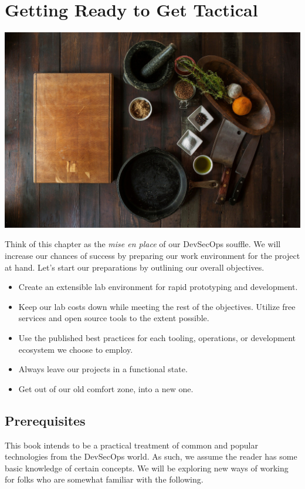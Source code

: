 \chapter{Getting Ready to Get Tactical}

\centering
\includegraphics[scale=0.20]{images/ingredients-498199_1920.jpg}


\justifying
Think of this chapter as the \emph{mise en place} of our DevSecOps souffle. We will increase our chances of success
by preparing our work environment for the project at hand. Let's start our preparations by outlining our
overall objectives. 

\justifying
\begin{itemize}
	\item Create an extensible lab environment for rapid prototyping and development.
	\item Keep our lab costs down while meeting the rest of the objectives. Utilize free services and open source tools to the extent possible.
	\item Use the published best practices for each tooling, operations, or development ecosystem we choose to employ.
	\item Always leave our projects in a functional state.
	\item Get out of our old comfort zone, into a new one.
\end{itemize}

\section{Prerequisites}

\justifying
This book intends to be a practical treatment of common and popular technologies from the DevSecOps world. As such, we assume
the reader has some basic knowledge of certain concepts. We will be exploring new ways of working for folks who
are somewhat familiar with the following.

